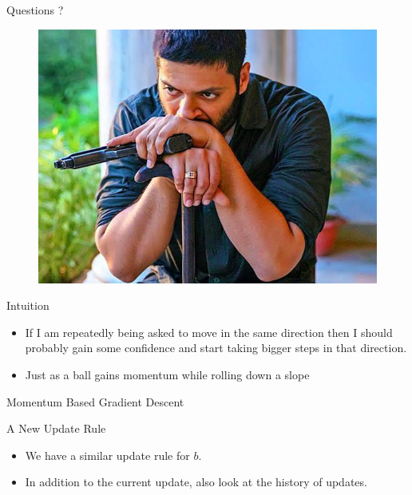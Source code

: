 \documentclass[10pt, aspectratio=169]{beamer}
\begin{document}
\begin{frame}{Questions ?}

\begin{figure}
\centering
\includegraphics[scale=0.4]{guddu_mirzapur}
\end{figure}
\end{frame}


\begin{frame}
\begin{block}{Intuition}

\begin{itemize}
\item<1-> If I am repeatedly being asked to move in the same direction then I should probably gain some confidence and start taking bigger steps in that direction.
\item<2-> Just as a ball gains momentum while rolling down a slope
\end{itemize}
\end{block}
\end{frame}

\begin{frame}{Momentum Based Gradient Descent}
\begin{block}{A New Update Rule}

\begin{itemize}
\item<2-> We have a similar update rule for $b$.
\item<3-> In addition to the current update, also look at the history of updates.
\end{itemize}

\end{block}
\end{frame}
\end{document}
